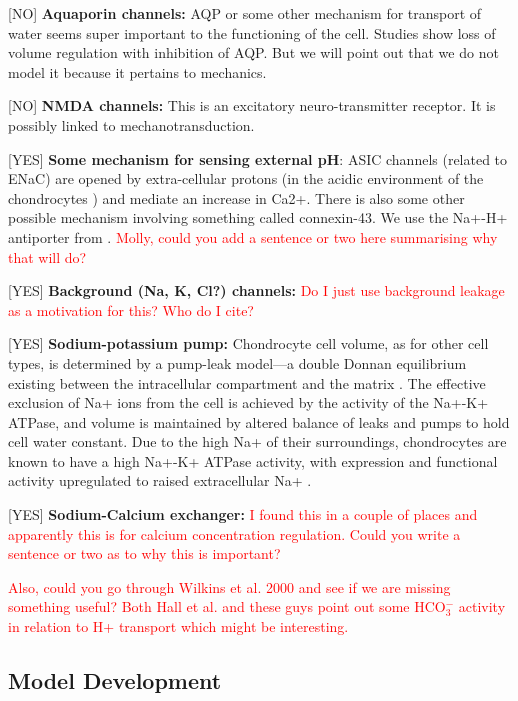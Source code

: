 [NO] {\bf Aquaporin channels:} AQP or some other mechanism for
transport of water seems super important to the functioning of the
cell. Studies show loss of volume regulation with inhibition of
AQP. But we will point out that we do not model it because it pertains
to mechanics.

[NO] {\bf NMDA channels:} This is an excitatory neuro-transmitter
receptor. It is possibly linked to mechanotransduction.

[YES] {\bf Some mechanism for sensing external pH}: ASIC channels
(related to ENaC) are opened by extra-cellular protons (in the acidic
environment of the chondrocytes ) and mediate an increase in
Ca2+. There is also some other possible mechanism involving something
called connexin-43. We use the Na+-H+ antiporter from
\citet{Halletal1996,Wilkinsetal2000}. \textcolor{red}{Molly, could you
  add a sentence or two here summarising why that will do?}

[YES] {\bf Background (Na, K, Cl?) channels:} \textcolor{red}{Do I just use
  background leakage as a motivation for this? Who do I cite?}

[YES] {\bf Sodium-potassium pump:} Chondrocyte cell volume, as for
other cell types, is determined by a pump-leak model---a double Donnan
equilibrium existing between the intracellular compartment and the
matrix \citep{Stockwell1991}. The effective exclusion of Na+ ions from
the cell is achieved by the activity of the Na+-K+ ATPase, and volume
is maintained by altered balance of leaks and pumps to hold cell water
constant. Due to the high Na+ of their surroundings, chondrocytes are
known to have a high Na+-K+ ATPase activity, with expression and
functional activity upregulated to raised extracellular Na+
\citep{Mobasherietal1997}.

[YES] {\bf Sodium-Calcium exchanger:} \textcolor{red}{I found this in
  a couple of places and apparently this is for calcium concentration
  regulation. Could you write a sentence or two as to why this is
  important?}

\textcolor{red}{Also, could you go through Wilkins et al. 2000 and see
if we are missing something useful? Both Hall et al. and these guys
point out some HCO$^{-}_{3}$ activity in relation to H+ transport
which might be interesting.}


\subsection{Model Development}
\label{sec:model-development}

